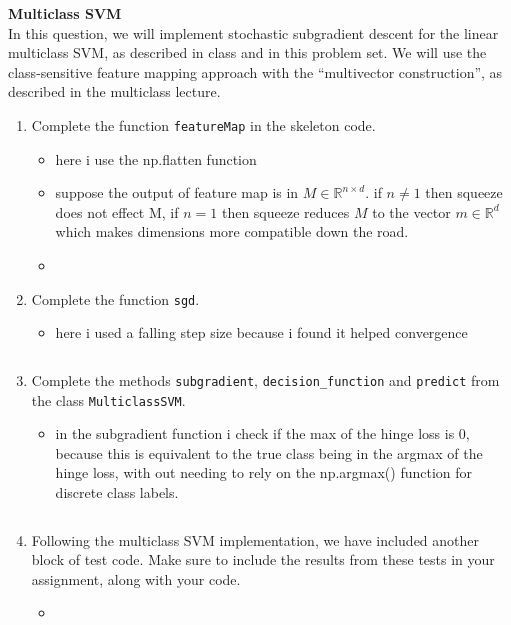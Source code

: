 \documentclass{article}
\newcommand{\nyuparagraph}[1]{\vspace{0.3cm}\textcolor{nyupurple}{\bf \large #1}\\}
\theoremstyle{plain}
\theoremstyle{definition}
\begin{document}
\nyuparagraph{Multiclass SVM}

In this question, we will implement stochastic subgradient descent
for the linear multiclass SVM, as described in class and in this
problem set. We will use the class-sensitive feature mapping approach
with the ``multivector construction'', as described in the multiclass lecture.
\begin{enumerate}
  \setcounter{enumi}{\value{saveenum}}
\item Complete the function \texttt{featureMap} in the skeleton code.
\begin{itemize}
    \color{blue}
    \item here i use the np.flatten function 
    \item suppose the output of feature map is in $M\in \mathbb{R}^{n\times d}$. if $n\neq 1$ then squeeze does not effect M, if $n=1$ then squeeze reduces $M$ to the vector $m\in \mathbb{R}^{d}$ which makes dimensions more compatible down the road. 
    \item 
             \inputminted[firstline=173, lastline=185, breaklines=True]{python}{hw_5.py}
\end{itemize}

\item Complete the function \texttt{sgd}.
\begin{itemize}
    \color{blue}
    \item here i used a falling step size because i found it helped convergence 
               \inputminted[firstline=186, lastline=209, breaklines=True]{python}{hw_5.py}
\end{itemize}

\item Complete the methods \texttt{subgradient}, \texttt{decision\_function} and \texttt{predict} from the class \texttt{MulticlassSVM}. 
\begin{itemize}
    \color{blue}
    \item in the subgradient function i check if the max of the hinge loss is 0, because this is equivalent to the true class being in the argmax of the hinge loss, with out needing to rely on the np.argmax() function for discrete class labels.  
               \inputminted[firstline=211, lastline=291, breaklines=True]{python}{hw_5.py}
\end{itemize}

\item Following the multiclass
SVM implementation, we have included another block of test code. Make
sure to include the results from these tests in your assignment, along
with your code. 
\begin{itemize}
    \color{blue}
    \item 


\end{itemize}
\end{enumerate}
\end{document}
